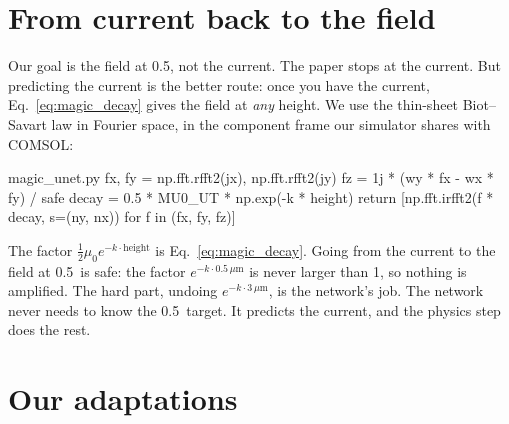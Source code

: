 \section{From current back to the field}

Our goal is the field at 0.5\um, not the current. The paper stops at the current. But predicting the current is the
better route: once you have the current, Eq.~\eqref{eq:magic_decay} gives the field at \emph{any} height. We use the
thin-sheet Biot--Savart law in Fourier space, in the component frame our simulator shares with COMSOL:

\begin{code*}{magic_unet.py}
    fx, fy = np.fft.rfft2(jx), np.fft.rfft2(jy)
    fz = 1j * (wy * fx - wx * fy) / safe
    decay = 0.5 * MU0_UT * np.exp(-k * height)
    return [np.fft.irfft2(f * decay, s=(ny, nx)) for f in (fx, fy, fz)]
\end{code*}

The factor $\tfrac12\mu_0 e^{-k\cdot\text{height}}$ is Eq.~\eqref{eq:magic_decay}. Going from the current to the field at
0.5\um\ is safe: the factor $e^{-k\cdot0.5\,\mu\text{m}}$ is never larger than 1, so nothing is amplified. The hard part,
undoing $e^{-k\cdot3\,\mu\text{m}}$, is the network's job. The network never needs to know the
0.5\um\ target. It predicts the current, and the physics step does the rest.

\section{Our adaptations}

